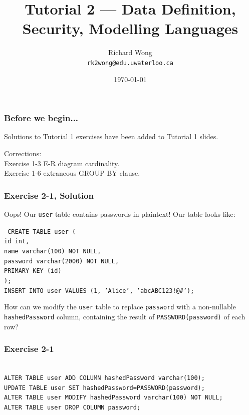 

\title{Tutorial 2 --- Data Definition, Security, Modelling Languages}

\author{Richard Wong \\ \small \texttt{rk2wong@edu.uwaterloo.ca}}
\date{\today}




\begin{frame}
  \titlepage

\end{frame}


\begin{frame}
\frametitle{Before we begin...}

Solutions to Tutorial 1 exercises have been added to Tutorial 1 slides.

Corrections: \\
Exercise 1-3 E-R diagram cardinality. \\
Exercise 1-6 extraneous GROUP BY clause.

\end{frame}


\begin{frame}
\frametitle{Exercise 2-1, Solution}

Oops! Our \texttt{user} table contains passwords in plaintext! Our table looks like:

\texttt{
  CREATE TABLE user ( \\
    id int, \\
    name varchar(100) NOT NULL, \\
    password varchar(2000) NOT NULL, \\
    PRIMARY KEY (id) \\
  ); \\
  INSERT INTO user VALUES (1, 'Alice', 'abcABC123!@\#');
}

How can we modify the \texttt{user} table to replace \texttt{password} with a non-nullable \texttt{hashedPassword} column, containing the result of \texttt{PASSWORD(password)} of each row?

\end{frame}


\begin{frame}
\frametitle{Exercise 2-1}

\texttt{ \\
  ALTER TABLE user ADD COLUMN hashedPassword varchar(100);\\
  UPDATE TABLE user SET hashedPassword=PASSWORD(password);\\
  ALTER TABLE user MODIFY hashedPassword varchar(100) NOT NULL;\\
  ALTER TABLE user DROP COLUMN password;
}

\end{frame}


